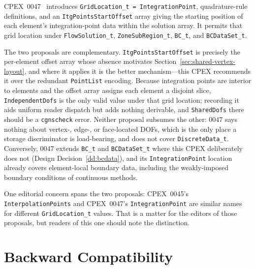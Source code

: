 \documentclass[11pt,letterpaper]{article}
\begin{document}
CPEX~0047~\cite{cpex0047} introduces
\texttt{GridLocation\_t = IntegrationPoint}, quadrature-rule
definitions, and an \texttt{ItgPointsStartOffset} array giving the
starting position of each element's integration-point data within the
solution array.  It permits that grid location under
\texttt{FlowSolution\_t}, \texttt{ZoneSubRegion\_t}, \texttt{BC\_t},
and \texttt{BCDataSet\_t}.

The two proposals are complementary.  \texttt{ItgPointsStartOffset} is
precisely the per-element offset array whose absence motivates
Section~\ref{sec:shared-vertex-layout}, and where it applies it is the
better mechanism---this CPEX recommends it over the redundant
\texttt{PointList} encoding.  Because integration points are interior to
elements and the offset array assigns each element a disjoint slice,
\texttt{IndependentDofs} is the only valid value under that grid location;
recording it aids uniform reader dispatch but adds nothing derivable,
and \texttt{SharedDofs} there should be a \texttt{cgnscheck} error.  Neither
proposal subsumes the other: 0047 says nothing about vertex-, edge-, or
face-located DOFs, which is the only place a storage discriminator is
load-bearing, and does not cover \texttt{DiscreteData\_t}.  Conversely,
0047 extends \texttt{BC\_t} and \texttt{BCDataSet\_t} where this CPEX
deliberately does not (Design Decision~\ref{dd:bcdata}), and its
\texttt{IntegrationPoint} location already covers element-local boundary
data, including the weakly-imposed boundary conditions of continuous
methods.

One editorial concern spans the two proposals: CPEX~0045's
\texttt{InterpolationPoints} and CPEX~0047's \texttt{IntegrationPoint}
are similar names for different \texttt{GridLocation\_t} values.  That
is a matter for the editors of those proposals, but readers of this one
should note the distinction.

\section{Backward Compatibility}
\label{sec:compat}
\end{document}
